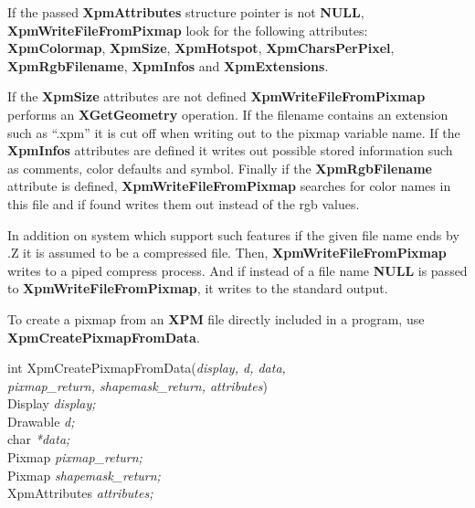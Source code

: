 If the passed {\bf XpmAttributes} structure pointer is not {\bf NULL}, {\bf
XpmWriteFileFromPixmap} look for the following attributes: {\bf XpmColormap},
{\bf XpmSize}, {\bf XpmHotspot}, {\bf XpmCharsPerPixel}, {\bf XpmRgbFilename},
{\bf XpmInfos} and {\bf XpmExtensions}.

If the {\bf XpmSize} attributes are not defined {\bf XpmWriteFileFromPixmap}
performs an {\bf XGetGeometry} operation. If the filename contains an
extension such as ``.xpm'' it is cut off when writing out to the pixmap
variable name. If the {\bf XpmInfos} attributes are defined it writes out
possible stored information such as comments, color defaults and symbol.
Finally if the {\bf XpmRgbFilename} attribute is defined, {\bf
XpmWriteFileFromPixmap} searches for color names in this file and if found
writes them out instead of the rgb values.

In addition on system which support such features if the given file name ends
by .Z it is assumed to be a compressed file. Then, {\bf XpmWriteFileFromPixmap}
writes to a piped compress process. And if instead of a file name {\bf NULL}
is passed to {\bf XpmWriteFileFromPixmap}, it writes to the standard output.

\vspace{.5cm}
To create a pixmap from an {\bf XPM} file directly included in a program, use
{\bf XpmCreatePixmapFromData}.

\begin{flushleft} 

int XpmCreatePixmapFromData({\it display, d, data, \\
\hspace{3cm}pixmap\_return, shapemask\_return, attributes})\\

\hspace{1cm}Display {\it *display;}\\
\hspace{1cm}Drawable {\it d;}\\
\hspace{1cm}char {\it **data;}\\
\hspace{1cm}Pixmap {\it *pixmap\_return;}\\
\hspace{1cm}Pixmap {\it *shapemask\_return;}\\
\hspace{1cm}XpmAttributes {\it *attributes;}

\end{flushleft}


